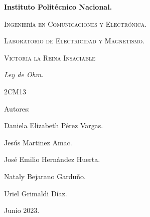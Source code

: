 \documentclass[10pt]{article}
\begin{document}
\pagestyle{fancy}
\cfoot{}


\lhead{}

\begin{titlepage}

	\begin{figure}[t]
		\hspace{0.6\textwidth}
	\end{figure}

	\centering
	{\bfseries\Huge Instituto Politécnico Nacional. \par}
	\vspace{1cm}
	{\scshape\Large Ingeniería en Comunicaciones y Electrónica. \par}
	\vspace{0.3cm}
	{\scshape\Large Laboratorio de Electricidad y Magnetismo.  \par}
	\vspace{1cm}
	{\scshape\Huge Victoria la Reina Insaciable \par}
	\vspace{1cm}
	{\itshape\Large Ley de Ohm. \par}
	{\Large 2CM13\par}
	\vfill
	{\Large Autores: \par}
	{\Large Daniela Elizabeth Pérez Vargas. \par}
	{\Large Jesús Martinez Amac. \par}
	{\Large José Emilio Hernández Huerta. \par}
	{\Large Nataly Bejarano Garduño.\par}
	{\Large Uriel Grimaldi Díaz.  \par}
	\vfill
	{\Large Junio 2023. \par}

\end{titlepage}
\end{document}
